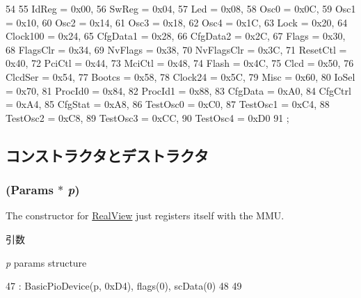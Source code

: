 \begin{DoxyCode}
54          {
55         IdReg      = 0x00,
56         SwReg      = 0x04,
57         Led        = 0x08,
58         Osc0       = 0x0C,
59         Osc1       = 0x10,
60         Osc2       = 0x14,
61         Osc3       = 0x18,
62         Osc4       = 0x1C,
63         Lock       = 0x20,
64         Clock100   = 0x24,
65         CfgData1   = 0x28,
66         CfgData2   = 0x2C,
67         Flags      = 0x30,
68         FlagsClr   = 0x34,
69         NvFlags    = 0x38,
70         NvFlagsClr = 0x3C,
71         ResetCtl   = 0x40,
72         PciCtl     = 0x44,
73         MciCtl     = 0x48,
74         Flash      = 0x4C,
75         Clcd       = 0x50,
76         ClcdSer    = 0x54,
77         Bootcs     = 0x58,
78         Clock24    = 0x5C,
79         Misc       = 0x60,
80         IoSel      = 0x70,
81         ProcId0    = 0x84,
82         ProcId1    = 0x88,
83         CfgData    = 0xA0,
84         CfgCtrl    = 0xA4,
85         CfgStat    = 0xA8,
86         TestOsc0   = 0xC0,
87         TestOsc1   = 0xC4,
88         TestOsc2   = 0xC8,
89         TestOsc3   = 0xCC,
90         TestOsc4   = 0xD0
91     };
\end{DoxyCode}


\subsection{コンストラクタとデストラクタ}
\hypertarget{classRealViewCtrl_a235c06ddf63669981becb52918686cb6}{
\subsubsection[{RealViewCtrl}]{ ({\bf Params} $\ast$ {\em p})}}
\label{classRealViewCtrl_a235c06ddf63669981becb52918686cb6}
The constructor for \hyperlink{classRealView}{RealView} just registers itself with the MMU. 
\begin{DoxyParams}{引数}
\item[{\em p}]params structure \end{DoxyParams}



\begin{DoxyCode}
47     : BasicPioDevice(p, 0xD4), flags(0), scData(0)
48 {
49 }
\end{DoxyCode}


